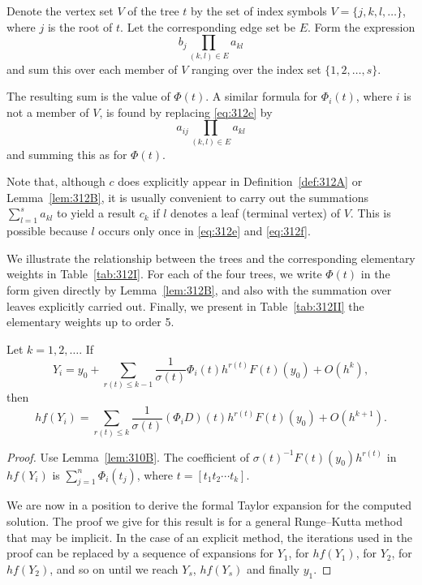 \begin{lemma}

  \label{lem:312B}
Denote the vertex set $V$ of the tree $t$ by the set of index symbols $V = \{j, k, l, \dots\}$, where $j$ is the root of $t$. Let the corresponding edge set be $E$. Form the expression
\[
b_{j} \prod_{(k,l) \in E} a_{kl} \tag{312e}
\]
and sum this over each member of $V$ ranging over the index set $\{1, 2, \dots, s\}$.

The resulting sum is the value of $\Phi(t)$. A similar formula for $\Phi_{i}(t)$, where $i$ is not a member of $V$, is found by replacing \eqref{eq:312e} by
\[
a_{ij} \prod_{(k,l) \in E} a_{kl} \tag{312f}
\]
and summing this as for $\Phi(t)$.

Note that, although $c$ does explicitly appear in Definition~\ref{def:312A} or Lemma~\ref{lem:312B}, it is usually convenient to carry out the summations $\sum_{l=1}^{s} a_{kl}$ to yield a result $c_{k}$ if $l$ denotes a leaf (terminal vertex) of $V$. This is possible because $l$ occurs only once in \eqref{eq:312e} and \eqref{eq:312f}.

We illustrate the relationship between the trees and the corresponding elementary weights in Table~\ref{tab:312I}. For each of the four trees, we write $\Phi(t)$ in the form given directly by Lemma~\ref{lem:312B}, and also with the summation over leaves explicitly carried out. Finally, we present in Table~\ref{tab:312II} the elementary weights up to order 5.
\end{lemma}

\begin{lemma}

  \label{lem:313A}
Let $k = 1, 2, \dots$. If
\[
Y_i = y_0 + \sum_{r(t) \leq k-1} \frac{1}{\sigma(t)} \Phi_i(t) h^{r(t)} F(t)(y_0) + O(h^k), \tag{313a}
\]
then
\[
hf(Y_i) = \sum_{r(t) \leq k} \frac{1}{\sigma(t)} (\Phi_i D)(t) h^{r(t)} F(t)(y_0) + O(h^{k+1}). \tag{313b}
\]
\end{lemma}

\begin{proof}
Use Lemma~\ref{lem:310B}. The coefficient of $\sigma(t)^{-1} F(t)(y_0) h^{r(t)}$ in $hf(Y_i)$ is $\sum_{j=1}^n \Phi_i(t_j)$, where $t = [t_1 t_2 \cdots t_k]$.

We are now in a position to derive the formal Taylor expansion for the computed solution. The proof we give for this result is for a general Runge--Kutta method that may be implicit. In the case of an explicit method, the iterations used in the proof can be replaced by a sequence of expansions for $Y_1$, for $hf(Y_1)$, for $Y_2$, for $hf(Y_2)$, and so on until we reach $Y_s$, $hf(Y_s)$ and finally $y_1$.
\end{proof}

